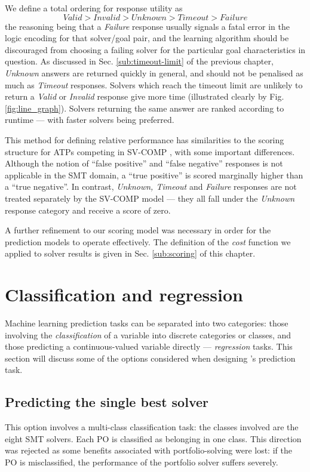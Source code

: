 We define a total ordering for response utility as 
\[
Valid > Invalid > Unknown > Timeout > Failure
\]  
the reasoning being that a \textit{Failure} response usually signals a fatal error in the logic encoding for that solver/goal pair, and the learning algorithm should be discouraged from choosing a failing solver for the particular goal characteristics in question. 
As discussed in Sec. \ref{sub:timeout-limit} of the previous chapter, \textit{Unknown} answers are returned quickly in general, and should not be penalised as much as \textit{Timeout} responses. 
Solvers which reach the timeout limit are unlikely to return a \textit{Valid} or \textit{Invalid} response give more time (illustrated clearly by Fig. \ref{fig:line_graph}).
Solvers returning the same answer are ranked according to runtime --- with faster solvers being preferred.

This method for defining relative performance has similarities to the scoring structure for ATPs competing in SV-COMP \cite{Beyer2016, SVCOMP}, with some important differences. 
Although the notion of ``false positive'' and ``false negative'' responses is not applicable in the SMT domain, a ``true positive'' is scored marginally higher than a ``true negative''. 
In contrast, \textit{Unknown, Timeout} and \textit{Failure} responses are not treated separately by the SV-COMP model --- they all fall under the \textit{Unknown} response category and receive a score of zero.

A further refinement to our scoring model was necessary in order for the prediction models to operate effectively. 
The definition of the \textit{cost} function we applied to solver results is given in Sec. \ref{sub:scoring} of this chapter. 

\section{Classification and regression}
\label{sec:reg-class}

Machine learning prediction tasks can be separated into two categories: those involving the \textit{classification} of a variable into discrete categories or classes, and those predicting a continuous-valued variable directly --- \textit{regression} tasks.
This section will discuss some of the options considered when designing \where's prediction task.

\subsection{Predicting the single best solver} This option involves a multi-class classification task: the classes involved are the eight SMT solvers.
Each PO is classified as belonging in one class. 
This direction was rejected as some benefits associated with portfolio-solving were lost: if the PO is misclassified, the performance of the portfolio solver suffers severely.
